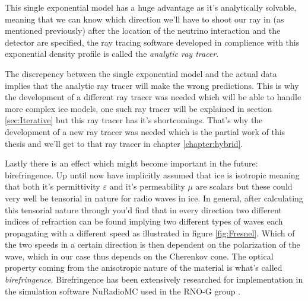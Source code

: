 \documentclass[11pt,a4paper,faculty=we,language=en,doctype=report]{cls/ugent-doc}
\begin{document}
This single exponential model has a huge advantage as it's analytically
solvable, meaning that we can know which direction we'll have to shoot our ray
in (as mentioned previously) after the location of the neutrino interaction and
the detector are specified, the ray tracing software developed in complience
with this exponential density profile is called the \textit{analytic ray
tracer}.

The discrepency between the single exponential model and the actual data
implies that the analytic ray tracer will make the wrong predictions.  This is
why the development of a different ray tracer was needed which will be able to
handle more complex ice models, one such ray tracer will be explained in
section \ref{sec:Iterative} but this ray tracer has it's shortcomings. That's
why the development of a new ray tracer was needed which is the partial work of
this thesis and we'll get to that ray tracer in chapter \ref{chapter:hybrid}.

Lastly there is an effect which might become important in the future:
birefringence.  Up until now have implicitly assumed that ice is isotropic
meaning that both it's permittivity $\varepsilon$ and it's permeability $\mu$
are scalars but these could very well be tensorial in nature for radio waves in
ice. In general, after calculating this tensorial nature through you'd find
that in every direction two different indices of refraction can be found
implying two different types of waves each propagating with a different speed
as illustrated in figure \ref{fig:Fresnel}. Which of the two speeds in a
certain direction is then dependent on the polarization of the wave, which in
our case thus depends on the Cherenkov cone. The optical property coming from
the anisotropic nature of the material is what's called \textit{birefringence}.
Birefringence has been extensively researched for implementation in the
simulation software NuRadioMC used in the RNO-G group \cite{Heyer2023}.
\end{document}
